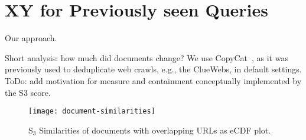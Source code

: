 \section{XY for Previously seen Queries}

Our approach.

Short analysis: how much did documents change? We use CopyCat~\cite{froebe:2021a}, as it was previously used to deduplicate web crawls, e.g., the ClueWebs, in default settings. ToDo: add motivation for measure and containment conceptually implemented by the S3 score.

\begin{figure}[t]
\texttt{[image: document-similarities]}
\vspace{-4ex}
\caption{S$_{3}$ Similarities of documents with overlapping URLs as eCDF plot.}
\label{fig:document-similarities}
\end{figure}
